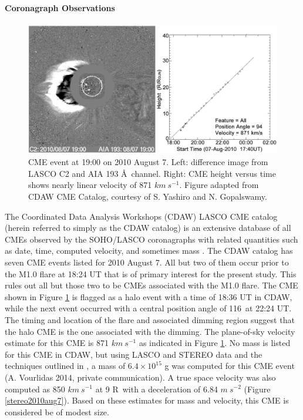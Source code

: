 \paragraph{Coronagraph Observations}

\begin{figure}[!h]
    \begin{center}
	    \includegraphics[width=150mm]{Images/Lasco2010Aug7Cme.png}
    \end{center}
    \caption[LASCO coronagraph data for 2010 August 7 event]{
        CME event at 19:00 on 2010 August 7. Left: difference image from LASCO C2 and AIA 193 \AA\ channel. 
        Right: CME height versus time shows nearly linear velocity of 871 $km\ s^{-1}$. 
        Figure adapted from CDAW CME Catalog, courtesy of S. Yashiro and N. Gopalswamy.
	}
    \label{lasco2010aug7}
\end{figure}

The Coordinated Data Analysis Workshops (CDAW) LASCO CME catalog (herein referred to simply as the CDAW catalog) is an extensive database of all CMEs observed by the SOHO/LASCO coronagraphs with related quantities such as date, time, computed velocity, and sometimes mass \citep{Gopalswamy2009}. The CDAW catalog has seven CME events listed for 2010 August 7. All but two of them occur prior to the M1.0 flare at 18:24 UT that is of primary interest for the present study. This rules out all but those two to be CMEs associated with the M1.0 flare. The CME shown in Figure \ref{lasco2010aug7} is flagged as a halo event with a time of 18:36 UT in CDAW, while the next event occurred with a central position angle of 116\degree\ at 22:24 UT. The timing and location of the flare and associated dimming region suggest that the halo CME is the one associated with the dimming. The plane-of-sky velocity estimate for this CME is 871 $km\ s^{-1}$ as indicated in Figure \ref{lasco2010aug7}. No mass is listed for this CME in CDAW, but using LASCO and STEREO data and the techniques outlined in \citet{Colaninno2009}, a mass of $6.4 \times 10^{15}$ g was computed for this CME event (A. Vourlidas 2014, private communication). A true space velocity was also computed as 850 $km\ s^{-1}$ at 9 R\astrosun\ with a deceleration of 6.84 $m\ s^{-2}$ (Figure \ref{stereo2010aug7}). Based on these estimates for mass and velocity, this CME is
considered be of modest size.

